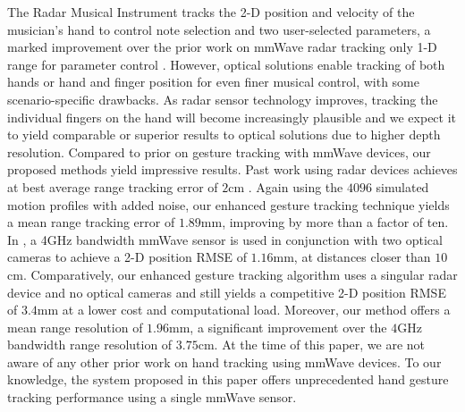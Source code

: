 \documentclass[10pt,journal,final]{IEEEtran}
\begin{document}
The Radar Musical Instrument tracks the 2-D position and velocity of the musician's hand to control note selection and two user-selected parameters, a marked improvement over the prior work on mmWave radar tracking only 1-D range for parameter control \cite{intro:soli_musical_instrument}. However, optical solutions enable tracking of both hands \cite{polfreman2011multi,jensenius2013kinectofon,hantrakul2014implementations,tompson2014real,ye2016spatial,sridhar2015fast,taylor2016efficient,oikonomidis2011efficient,tang2015opening} or hand and finger position \cite{han2014lessons,intro:RGBcamera} for even finer musical control, with some scenario-specific drawbacks. As radar sensor technology improves, tracking the individual fingers on the hand will become increasingly plausible and we expect it to yield comparable or superior results to optical solutions due to higher depth resolution. Compared to prior on gesture tracking with mmWave devices, our proposed methods yield impressive results. Past work using radar devices achieves at best average range tracking error of $2$cm \cite{mmWave_tracking:WiDeo}. Again using the $4096$ simulated motion profiles with added noise, our enhanced gesture tracking technique yields a mean range tracking error of $1.89$mm, improving by more than a factor of ten. In \cite{mmWave_tracking:ThuMouse}, a 4GHz bandwidth mmWave sensor is used in conjunction with two optical cameras to achieve a 2-D position RMSE of $1.16$mm, at distances closer than $10$cm. Comparatively, our enhanced gesture tracking algorithm uses a singular radar device and no optical cameras and still yields a competitive 2-D position RMSE of $3.4$mm at a lower cost and computational load. Moreover, our method offers a mean range resolution of $1.96$mm, a significant improvement over the $4$GHz bandwidth range resolution of $3.75$cm. At the time of this paper, we are not aware of any other prior work on hand tracking using mmWave devices. To our knowledge, the system proposed in this paper offers unprecedented hand gesture tracking performance using a single mmWave sensor.

\end{document}
